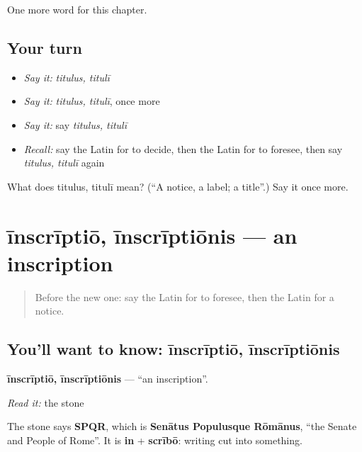 \begin{grammarlens}[title={What you've built}]
One more word for this chapter.
\end{grammarlens}

\subsection*{Your turn}
\begin{itemize}
\raggedright
  \item \emph{Say it:} \emph{titulus, titulī}
  \item \emph{Say it:} \emph{titulus, titulī}, once more
  \item \emph{Say it:} say \emph{titulus, titulī}
  \item \emph{Recall:} say the Latin for to decide, then the Latin for to foresee, then say \emph{titulus, titulī} again
\end{itemize}

\begin{tcolorbox}[breakable,colback=teal!4,colframe=teal!35!black,title={Before you move on}]
What does titulus, titulī mean? (\textquotedblleft{}A notice, a label; a title\textquotedblright{}.) Say it once more.
\end{tcolorbox}
\section[īnscrīptiō, īnscrīptiōnis]{īnscrīptiō, īnscrīptiōnis — an inscription}

\label{lesson:LA-C164-inscriptio}



\begin{quote}
Before the new one: say the Latin for to foresee, then the Latin for a notice.
\end{quote}

\subsection*{You'll want to know: īnscrīptiō, īnscrīptiōnis}
\textbf{īnscrīptiō, īnscrīptiōnis} — \textquotedblleft{}an inscription\textquotedblright{}.

\emph{Read it:} the stone

The stone says \textbf{SPQR}, which is \textbf{Senātus Populusque Rōmānus}, \textquotedblleft{}the Senate and People of Rome\textquotedblright{}. It is \textbf{in} + \textbf{scrībō}: writing cut into something.

